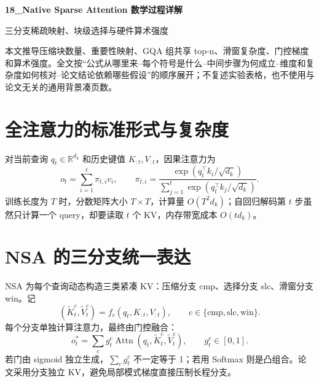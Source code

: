 \documentclass[UTF8,12pt,a4paper,fontset=none]{ctexart}
\numberwithin{equation}{section}
\newcommand{\R}{\mathbb{R}}
\begin{document}
\begin{center}
{\LARGE\bfseries 18\_Native Sparse Attention 数学过程详解}\par
\vspace{0.35em}
{\large 三分支稀疏映射、块级选择与硬件算术强度}
\end{center}
\vspace{0.45em}
\begin{keybox}[本文只处理真正需要推导的部分]
本文推导压缩块数量、重要性映射、GQA 组共享 top-n、滑窗复杂度、门控梯度和算术强度。全文按“公式从哪里来--每个符号是什么--中间步骤为何成立--维度和复杂度如何核对--论文结论依赖哪些假设”的顺序展开；不复述实验表格，也不使用与论文无关的通用背景凑页数。
\end{keybox}
\tableofcontents
\newpage

\section{全注意力的标准形式与复杂度}
对当前查询 $q_t\in\R^{d_k}$ 和历史键值 $K_{:t},V_{:t}$，因果注意力为
\begin{equation}
 o_t=\sum_{i=1}^{t}\pi_{t,i}v_i,
 \qquad
 \pi_{t,i}=\frac{\exp(q_t^\top k_i/\sqrt{d_k})}
 {\sum_{j=1}^{t}\exp(q_t^\top k_j/\sqrt{d_k})}.
\end{equation}
训练长度为 $T$ 时，分数矩阵大小 $T\times T$，计算量 $O(T^2d_k)$；自回归解码第 $t$ 步虽然只计算一个 query，却要读取 $t$ 个 KV，内存带宽成本 $O(td_k)$。

\section{NSA 的三分支统一表达}
NSA 为每个查询动态构造三类紧凑 KV：压缩分支 cmp、选择分支 slc、滑窗分支 win。记
\begin{equation}
 (\widetilde K_t^c,\widetilde V_t^c)=f_c(q_t,K_{:t},V_{:t}),
 \qquad c\in\{\mathrm{cmp},\mathrm{slc},\mathrm{win}\}.
\end{equation}
每个分支单独计算注意力，最终由门控融合：
\begin{equation}
 \boxed{o_t^*=\sum_c g_t^c\operatorname{Attn}
 (q_t,\widetilde K_t^c,\widetilde V_t^c),\qquad g_t^c\in[0,1].}
\end{equation}
若门由 sigmoid 独立生成，$\sum_cg_t^c$ 不一定等于 1；若用 Softmax 则是凸组合。论文采用分支独立 KV，避免局部模式梯度直接压制长程分支。
\end{document}
